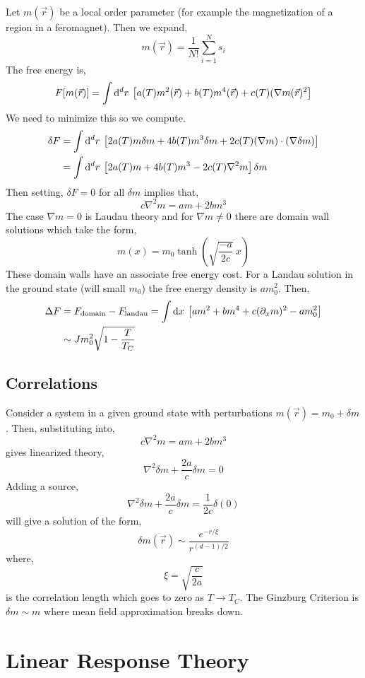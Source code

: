 \documentclass[12pt]{article}
\begin{document}
Let $m(\vec{r})$ be a local order parameter (for example the magnetization of a region in a feromagnet). Then we expand,
\[ m(\vec{r}) = \frac{1}{N!} \sum_{i = 1}^N s_i \]
The free energy is,
\[ F[m(\vec{r})] = \int \mathrm{d}^{d} r \: \left[ a(T) m^2(\vec{r}) + b(T) m^4(\vec{r}) + c(T) (\nabla m(\vec{r})^2  \right] \]
We need to minimize this so we compute.
\begin{align*}
\delta F & = \int \mathrm{d}^{d} r \: \left[ 2 a(T) m \delta m + 4 b(T) m^3 \delta m + 2 c(T) (\nabla m) \cdot (\nabla \delta m) \right] 
\\
& = \int \mathrm{d}^{d} r \: \left[ 2 a(T) m  + 4 b(T) m^3  - 2 c(T) \nabla^2 m \right] \delta m 
\end{align*}
Then setting, $\delta F = 0$ for all $\delta m$ implies that,
\[ c \nabla^2 m = a m + 2 b m^3 \]
The case $\nabla m = 0$ is Laudau theory and for $\nabla m \neq 0$ there are domain wall solutions which take the form,
\[ m(x) = m_0 \tanh{\left( \sqrt{\frac{-a}{2c}} \: x \right)} \]
These domain walls have an associate free energy cost. For a Landau solution in the ground state (will small $m_0$) the free energy density is $a m_0^2$. Then,
\begin{align*}
\Delta F & = F_{\text{domain}} - F_{\text{landau}} = \int \mathrm{d}x \: \left[ a m^2 + b m^4 + c (\partial_x m)^2 - a m_0^2 \right]
\\
& \sim J m_0^2 \sqrt{1 - \frac{T}{T_C}}
\end{align*}

\subsection{Correlations}

Consider a system in a given ground state with perturbations $m(\vec{r}) = m_0 + \delta m$. Then, substituting into,
\[ c \nabla^2 m = a m + 2 b m^3 \]
gives linearized theory,
\[ \nabla^2 \delta m + \frac{2 a}{c} \delta m = 0 \]
Adding a source,
\[ \nabla^2 \delta m + \frac{2 a}{c} \delta m = \frac{1}{2 c} \delta(0) \]
will give a solution of the form,
\[ \delta m(\vec{r}) \sim \frac{e^{-r / \xi}}{r^{(d - 1)/2}} \]
where,
\[ \xi = \sqrt{\frac{c}{2 a}} \]
is the correlation length which goes to zero as $T \to T_C$.  
The Ginzburg Criterion is $\delta m \sim m$ where mean field approximation breaks down. 

\section{Linear Response Theory}
\end{document}

